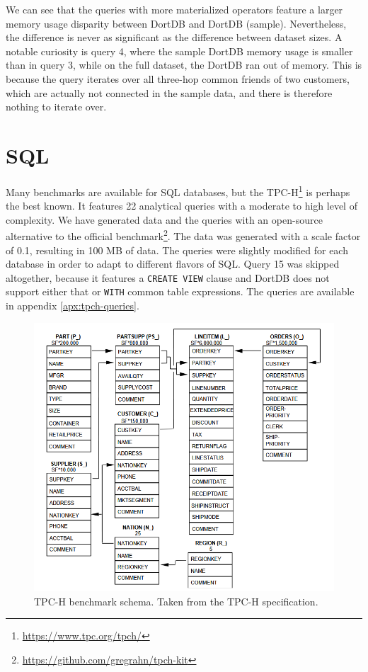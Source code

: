 We can see that the queries with more materialized operators feature a larger memory usage disparity between DortDB and DortDB (sample). Nevertheless, the difference is never as significant as the difference between dataset sizes. A notable curiosity is query 4, where the sample DortDB memory usage is smaller than in query 3, while on the full dataset, the DortDB ran out of memory. This is because the query iterates over all three-hop common friends of two customers, which are actually not connected in the sample data, and there is therefore nothing to iterate over.

\section{SQL}
\label{sec:sql-benchmarks}

Many benchmarks are available for SQL databases, but the TPC-H\footnote{\url{https://www.tpc.org/tpch/}} is perhaps the best known. It features 22 analytical queries with a moderate to high level of complexity. We have generated data and the queries with an open-source alternative to the official benchmark\footnote{\url{https://github.com/gregrahn/tpch-kit}}. The data was generated with a scale factor of 0.1, resulting in 100 MB of data. The queries were slightly modified for each database in order to adapt to different flavors of SQL. Query 15 was skipped altogether, because it features a \texttt{CREATE VIEW} clause and DortDB does not support either that or \texttt{WITH} common table expressions. The queries are available in appendix \ref{apx:tpch-queries}.

\begin{figure}
    \centering
    \includegraphics[width=0.7\linewidth]{img/tpch-schema.png}
    \caption{TPC-H benchmark schema. Taken from the TPC-H specification\protect\footnotemark.}
\end{figure}

